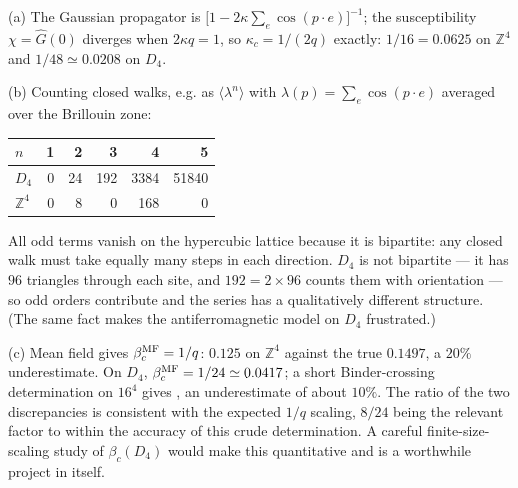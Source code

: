 {(a) The Gaussian propagator is
$\bigl[1-2\kappa\sum_e\cos(p\!\cdot\!e)\bigr]^{-1}$; the susceptibility
$\chi=\widehat{G}(0)$ diverges when $2\kappa q = 1$, so $\kappa_c = 1/(2q)$
exactly: $1/16 = 0.0625$ on $\mathbb{Z}^4$ and $1/48 \simeq 0.0208$ on $D_4$.

(b) Counting closed walks, e.g. as $\langle\lambda^n\rangle$ with
$\lambda(p)=\sum_e\cos(p\!\cdot\!e)$ averaged over the Brillouin zone:
\begin{center}
\begin{tabular}{lrrrrr}
 $n$            & 1 & 2 & 3 & 4 & 5\\ \hline
 $D_4$          & 0 & 24 & 192 & 3384 & 51840\\
 $\mathbb{Z}^4$ & 0 & 8 & 0 & 168 & 0
\end{tabular}
\end{center}
All odd terms vanish on the hypercubic lattice because it is bipartite: any
closed walk must take equally many steps in each direction. $D_4$ is not
bipartite --- it has $96$ triangles through each site, and $192 = 2\times96$
counts them with orientation --- so odd orders contribute and the series has a
qualitatively different structure. (The same fact makes the antiferromagnetic
model on $D_4$ frustrated.)

(c) Mean field gives $\beta_c^{\rm MF}=1/q$: $0.125$ on $\mathbb{Z}^4$ against
the true $0.1497$, a $20\%$ underestimate. On $D_4$, $\beta_c^{\rm MF}=1/24
\simeq0.0417$; a short Binder-crossing determination on $16^4$ gives
, an underestimate of about $10\%$. The ratio of the
two discrepancies is consistent with the expected $1/q$ scaling, $8/24$ being
the relevant factor to within the accuracy of this crude determination. A
careful finite-size-scaling study of $\beta_c(D_4)$ would make this
quantitative and is a worthwhile project in itself.}

